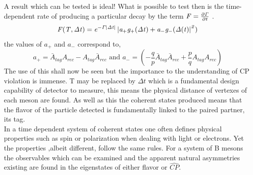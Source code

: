 A result which can be tested is ideal! What is possible to test then is the time-dependent rate of producing a particular decay by the term $\it{F}=\frac{\partial\Gamma}{\partial t}$ \cite{CKM5}. 
\begin{equation}\label{BPME13}
\it{F}(T,\Delta t)=e^{-\Gamma\left|\Delta t\right|}\left| a_{+}g_{+}(\Delta t)+ a_{-}g_{-}(\Delta (t) \right|^{2})
\end{equation}
the values of $a_+$ and $a_-$ correspond to,
\begin{equation}\label{BPME14}
 a_{+}=\bar{A}_{tag}A_{rec}-A_{tag}\bar{A}_{rec} \mbox{ and }a_{-}=\left(-\frac{q}{p}\bar{A}_{tag}\bar{A}_{rec}+\frac{p}{q}A_{tag}A_{rec}\right)
\end{equation}
The use of this shall now be seen but the importance to the understanding of CP violation is immense. T may be replaced by $\Delta t$ which is a fundamental design capability of detector to measure, this means the physical distance of vertexes of each meson are found. As well as this the coherent states produced means that the flavor of the particle detected is fundamentally linked to the paired partner, its tag.
\\

In a time dependent system of coherent states one often defines physical properties such as spin or polarization when dealing with light or electrons. Yet the properties ,albeit different, follow the same rules. For a system of B mesons the observables which can be examined and the apparent natural asymmetries existing are found in the eigenstates of either flavor or $\hat{CP}$. 

